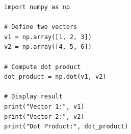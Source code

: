 \begin{verbatim}
import numpy as np

# Define two vectors
v1 = np.array([1, 2, 3])
v2 = np.array([4, 5, 6])

# Compute dot product
dot_product = np.dot(v1, v2)

# Display result
print("Vector 1:", v1)
print("Vector 2:", v2)
print("Dot Product:", dot_product)
\end{verbatim}